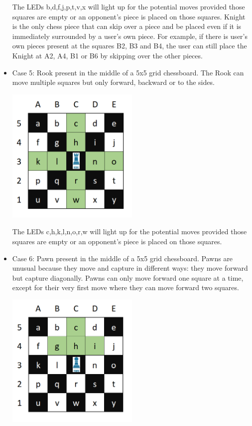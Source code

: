 \documentclass[12pt, titlepage]{article}
\begin{document}
\begin{itemize}
  The LEDs b,d,f,j,p,t,v,x will light up for the potential moves provided those squares are empty or an opponent’s piece is placed on those squares. Knight is the only chess 
  piece that can skip over a piece and be placed even if it is immediately surrounded by a user’s own piece. For example, if there is user’s own pieces present at the 
  squares B2, B3 and B4, the user can still place the Knight at A2, A4, B1 or B6 by skipping over the other pieces.

    \item Case 5: Rook present in the middle of a 5x5 grid chessboard. The Rook can move multiple squares but only forward, backward or to the sides. 
  
    \begin{minipage}{\linewidth}
      \centering
      \includegraphics[width=0.5\textwidth]{rook}
  \end{minipage}

  The LEDs c,h,k,l,n,o,r,w will light up for the potential moves provided those squares are empty or an opponent’s piece is placed on those squares.

    \item Case 6: Pawn present in the middle of a 5x5 grid chessboard. Pawns are unusual because they move and capture in different ways: they move forward but capture 
    diagonally. Pawns can only move forward one square at a time, except for their very first move where they can move forward two squares.

    \begin{minipage}{\linewidth}
      \centering
      \includegraphics[width=0.5\textwidth]{pawn}
  \end{minipage}


\end{itemize}
\end{document}
